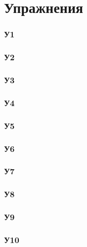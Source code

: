 \section{Упражнения}

\subsubsection*{У1}


\subsubsection*{У2}


\subsubsection*{У3}


\subsubsection*{У4}


\subsubsection*{У5}


\subsubsection*{У6}


\subsubsection*{У7}


\subsubsection*{У8}


\subsubsection*{У9}


\subsubsection*{У10}


